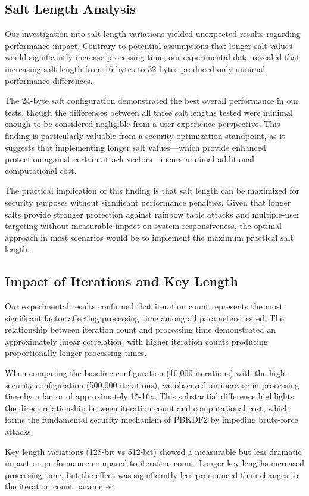 \documentclass[11pt,a4paper]{article}
\begin{document}
\subsection{Salt Length Analysis}
Our investigation into salt length variations yielded unexpected results regarding performance impact. Contrary to potential assumptions that longer salt values would significantly increase processing time, our experimental data revealed that increasing salt length from 16 bytes to 32 bytes produced only minimal performance differences.

The 24-byte salt configuration demonstrated the best overall performance in our tests, though the differences between all three salt lengths tested were minimal enough to be considered negligible from a user experience perspective. This finding is particularly valuable from a security optimization standpoint, as it suggests that implementing longer salt values—which provide enhanced protection against certain attack vectors—incurs minimal additional computational cost.

The practical implication of this finding is that salt length can be maximized for security purposes without significant performance penalties. Given that longer salts provide stronger protection against rainbow table attacks and multiple-user targeting without measurable impact on system responsiveness, the optimal approach in most scenarios would be to implement the maximum practical salt length.

\subsection{Impact of Iterations and Key Length}
Our experimental results confirmed that iteration count represents the most significant factor affecting processing time among all parameters tested. The relationship between iteration count and processing time demonstrated an approximately linear correlation, with higher iteration counts producing proportionally longer processing times.

When comparing the baseline configuration (10,000 iterations) with the high-security configuration (500,000 iterations), we observed an increase in processing time by a factor of approximately 15-16x. This substantial difference highlights the direct relationship between iteration count and computational cost, which forms the fundamental security mechanism of PBKDF2 by impeding brute-force attacks.

Key length variations (128-bit vs 512-bit) showed a measurable but less dramatic impact on performance compared to iteration count. Longer key lengths increased processing time, but the effect was significantly less pronounced than changes to the iteration count parameter.
\end{document}
